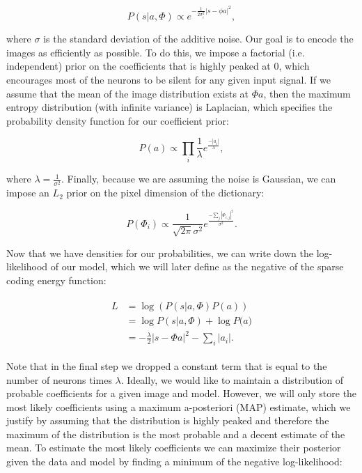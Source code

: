 \begin{equation}\label{eq:ch2_image_likelihood}
    P(s|a,\Phi) \propto e^{-\frac{1}{2\sigma_{i}^{2}}|s-\phi a|^{2}},
\end{equation}

\noindent where $\sigma$ is the standard deviation of the additive noise. Our goal is to encode the images as efficiently as possible. To do this, we impose a factorial (i.e. independent) prior on the coefficients that is highly peaked at 0, which encourages most of the neurons to be silent for any given input signal. If we assume that the mean of the image distribution exists at $\Phi a$, then the maximum entropy distribution (with infinite variance) is Laplacian, which specifies the probability density function for our coefficient prior:

\begin{equation}\label{eq:ch2_coefficient_prior}
    P(a) \propto \prod_{i}\frac{1}{\lambda} e^{\frac{-|a_{i}|}{\lambda}},
\end{equation}

\noindent where $\lambda = \tfrac{1}{\sigma^{2}}$. Finally, because we are assuming the noise is Gaussian, we can impose an $L_{2}$ prior on the pixel dimension of the dictionary:

\begin{equation}\label{eq:ch2_dictionary_prior}
    P(\Phi_{i}) \propto \frac{1}{\sqrt{2\pi}\sigma^{2}}e^{\frac{-\sum_{j}|\Phi_{i,j}|^{2}}{\sigma^{2}}}.
\end{equation}

Now that we have densities for our probabilities, we can write down the log-likelihood of our model, which we will later define as the negative of the sparse coding energy function:

\begin{align}\label{eq:ch2_log_likelihood}
\begin{split}
    L &= \log\left(P(s|a,\Phi)P(a)\right) \\
      &= \log{P(s|a,\Phi)} + \log{P(a}) \\
      &= -\frac{\lambda}{2}|s - \Phi a|^{2} - \sum_{i}|a_{i}|.
\end{split}
\end{align}

Note that in the final step we dropped a constant term that is equal to the number of neurons times $\lambda$. Ideally, we would like to maintain a distribution of probable coefficients for a given image and model. However, we will only store the most likely coefficients using a maximum a-posteriori (MAP) estimate, which we justify by assuming that the distribution is highly peaked and therefore the maximum of the distribution is the most probable and a decent estimate of the mean. To estimate the most likely coefficients we can maximize their posterior given the data and model by finding a minimum of the negative log-likelihood:

